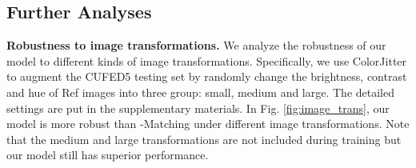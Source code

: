 \documentclass[runningheads]{llncs}
\begin{document}
\begin{table}[t]
\setlength\belowcaptionskip{-5pt}
\setlength\abovecaptionskip{-9pt}
\caption{Performance in terms of different similarity levels on CUFED5 test set.}
\begin{center}
\label{tab:diff_sim}
\end{center}
\end{table}



\subsection{Further Analyses}
\noindent\textbf{Robustness to image transformations.}
We analyze the robustness of our model to different kinds of image transformations.
Specifically, we use ColorJitter to augment the CUFED5 testing set by randomly change the brightness, contrast and hue of Ref images into three group: small, medium and large. 
The detailed settings are put in the supplementary materials.
In Fig. \ref{fig:image_trans}, our model is more robust than -Matching \cite{jiang2021robust} under different image transformations.
Note that the medium and large transformations are not included during training but our model still has superior performance.
\end{document}

